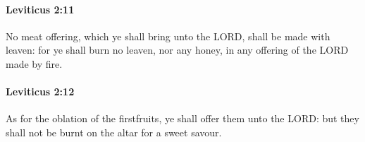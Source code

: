 		\paragraph{Leviticus 2:11} %
			\label{LEVITICUS-2-11}

			No meat offering, which ye shall bring unto the LORD, shall be made with leaven: for ye shall burn no leaven, nor any honey, in any offering of the LORD made by fire.


		\paragraph{Leviticus 2:12} %
			\label{LEVITICUS-2-12}

			As for the oblation of the firstfruits, ye shall offer them unto the LORD: but they shall not be burnt on the altar for a sweet savour.


